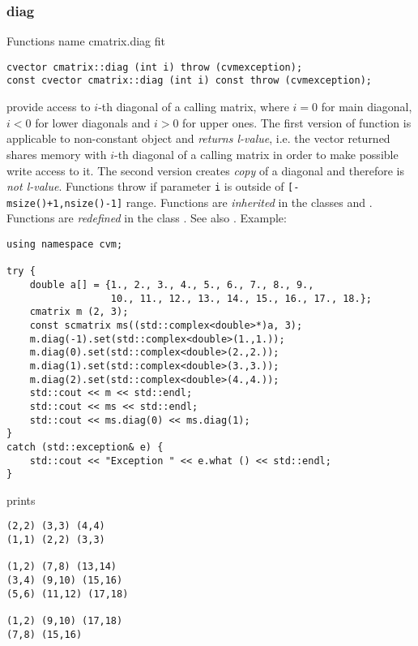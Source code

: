 \subsubsection{diag}
Functions%
\pdfdest name {cmatrix.diag} fit
\begin{verbatim}
cvector cmatrix::diag (int i) throw (cvmexception);
const cvector cmatrix::diag (int i) const throw (cvmexception);
\end{verbatim}
provide access to  \hbox{$i$-th} diagonal of a calling matrix,
where $i=0$ for main diagonal, $i<0$ for lower diagonals 
and $i>0$ for upper ones.
The first version
of  function is applicable to  non-constant object and
\emph{returns  l-value}, i.e. the vector returned shares memory
with  \hbox{$i$-th} diagonal of a calling matrix
in order to make possible write access to it.
The second version creates  \emph{copy} of a diagonal and therefore is
\emph{not  l-value}.
Functions throw 
if  parameter \verb"i" is outside of 
\verb"[-msize()+1,nsize()-1]" range.
Functions are \emph{inherited}
in the classes
 and .
Functions are \emph{redefined} in the class .
See also .
Example:
\begin{Verbatim}
using namespace cvm;

try {
    double a[] = {1., 2., 3., 4., 5., 6., 7., 8., 9., 
                  10., 11., 12., 13., 14., 15., 16., 17., 18.};
    cmatrix m (2, 3);
    const scmatrix ms((std::complex<double>*)a, 3);
    m.diag(-1).set(std::complex<double>(1.,1.));
    m.diag(0).set(std::complex<double>(2.,2.));
    m.diag(1).set(std::complex<double>(3.,3.));
    m.diag(2).set(std::complex<double>(4.,4.));
    std::cout << m << std::endl;
    std::cout << ms << std::endl;
    std::cout << ms.diag(0) << ms.diag(1);
}
catch (std::exception& e) {
    std::cout << "Exception " << e.what () << std::endl;
}
\end{Verbatim}
prints
\begin{Verbatim}
(2,2) (3,3) (4,4)
(1,1) (2,2) (3,3)

(1,2) (7,8) (13,14)
(3,4) (9,10) (15,16)
(5,6) (11,12) (17,18)

(1,2) (9,10) (17,18)
(7,8) (15,16)
\end{Verbatim}
\newpage



